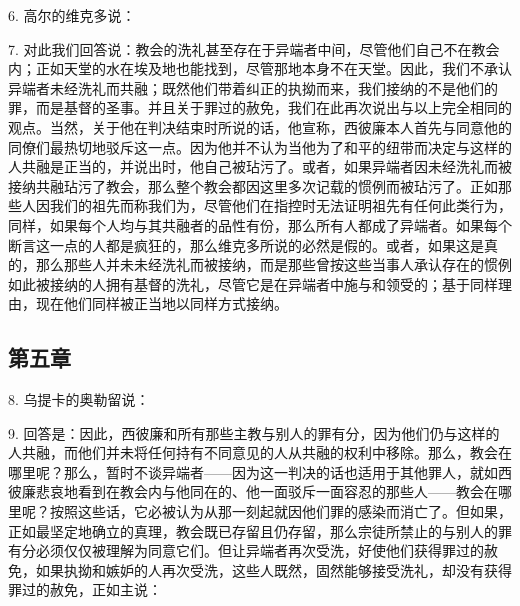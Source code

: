 6. 高尔的维克多说：\par

7. 对此我们回答说：教会的洗礼甚至存在于异端者中间，尽管他们自己不在教会内；正如天堂的水在埃及地也能找到，尽管那地本身不在天堂。因此，我们不承认异端者未经洗礼而共融；既然他们带着纠正的执拗而来，我们接纳的不是他们的罪，而是基督的圣事。并且关于罪过的赦免，我们在此再次说出与以上完全相同的观点。当然，关于他在判决结束时所说的话，他宣称，西彼廉本人首先与同意他的同僚们最热切地驳斥这一点。因为他并不认为当他为了和平的纽带而决定与这样的人共融是正当的，并说出时，他自己被玷污了。或者，如果异端者因未经洗礼而被接纳共融玷污了教会，那么整个教会都因这里多次记载的惯例而被玷污了。正如那些人因我们的祖先而称我们为，尽管他们在指控时无法证明祖先有任何此类行为，同样，如果每个人均与其共融者的品性有份，那么所有人都成了异端者。如果每个断言这一点的人都是疯狂的，那么维克多所说的必然是假的。或者，如果这是真的，那么那些人并未未经洗礼而被接纳，而是那些曾按这些当事人承认存在的惯例如此被接纳的人拥有基督的洗礼，尽管它是在异端者中施与和领受的；基于同样理由，现在他们同样被正当地以同样方式接纳。\par


\subsection{第五章}

8. 乌提卡的奥勒留说：\par

9. 回答是：因此，西彼廉和所有那些主教与别人的罪有分，因为他们仍与这样的人共融，而他们并未将任何持有不同意见的人从共融的权利中移除。那么，教会在哪里呢？那么，暂时不谈异端者——因为这一判决的话也适用于其他罪人，就如西彼廉悲哀地看到在教会内与他同在的、他一面驳斥一面容忍的那些人——教会在哪里呢？按照这些话，它必被认为从那一刻起就因他们罪的感染而消亡了。但如果，正如最坚定地确立的真理，教会既已存留且仍存留，那么宗徒所禁止的与别人的罪有分必须仅仅被理解为同意它们。但让异端者再次受洗，好使他们获得罪过的赦免，如果执拗和嫉妒的人再次受洗，这些人既然，固然能够接受洗礼，却没有获得罪过的赦免，正如主说：\par

